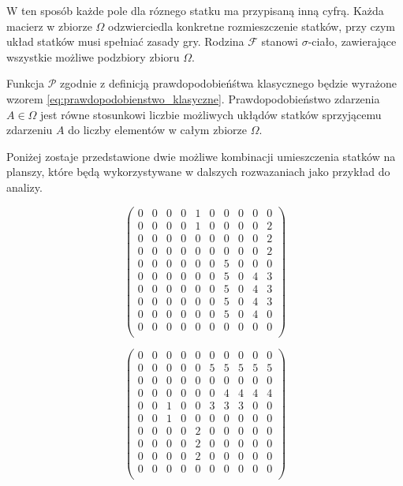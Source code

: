 \documentclass[magisterska]{pracadypl}
\begin{document}
W ten sposób każde pole dla róznego statku ma przypisaną inną cyfrą. Każda macierz w zbiorze \(\Omega\) odzwierciedla konkretne rozmieszczenie statków, przy czym układ statków musi spełniać zasady gry. Rodzina \(\mathcal{F}\) stanowi \(\sigma\)-ciało, zawierające wszystkie możliwe podzbiory zbioru \(\Omega\).

Funkcja  \(\mathcal{P}\) zgodnie z definicją prawdopodobieńśtwa klasycznego będzie wyrażone wzorem \eqref{eq:prawdopodobienstwo_klasyczne}. Prawdopodobieństwo zdarzenia $A \in \Omega$ jest równe stosunkowi liczbie możliwych ukłądów statków sprzyjącemu zdarzeniu \(A\) do liczby elementów w całym zbiorze \(\Omega\).


Poniżej zostaje przedstawione dwie możliwe kombinacji umieszczenia statków na planszy, które będą wykorzystywane w dalszych rozwazaniach jako przykład do analizy.


\begin{equation}
\begin{pmatrix}
0 & 0 & 0 & 0 & 1 & 0 & 0 & 0 & 0 & 0 \\
0 & 0 & 0 & 0 & 1 & 0 & 0 & 0 & 0 & 2 \\
0 & 0 & 0 & 0 & 0 & 0 & 0 & 0 & 0 & 2 \\
0 & 0 & 0 & 0 & 0 & 0 & 0 & 0 & 0 & 2 \\
0 & 0 & 0 & 0 & 0 & 0 & 5 & 0 & 0 & 0 \\
0 & 0 & 0 & 0 & 0 & 0 & 5 & 0 & 4 & 3 \\
0 & 0 & 0 & 0 & 0 & 0 & 5 & 0 & 4 & 3 \\
0 & 0 & 0 & 0 & 0 & 0 & 5 & 0 & 4 & 3 \\
0 & 0 & 0 & 0 & 0 & 0 & 5 & 0 & 4 & 0 \\
0 & 0 & 0 & 0 & 0 & 0 & 0 & 0 & 0 & 0 \\
\end{pmatrix}
\label{eq:example_board}
\end{equation}

\begin{equation}
\begin{pmatrix}
0 & 0 & 0 & 0 & 0 & 0 & 0 & 0 & 0 & 0 \\
0 & 0 & 0 & 0 & 0 & 5 & 5 & 5 & 5 & 5 \\
0 & 0 & 0 & 0 & 0 & 0 & 0 & 0 & 0 & 0 \\
0 & 0 & 0 & 0 & 0 & 0 & 4 & 4 & 4 & 4 \\
0 & 0 & 1 & 0 & 0 & 3 & 3 & 3 & 0 & 0 \\
0 & 0 & 1 & 0 & 0 & 0 & 0 & 0 & 0 & 0 \\
0 & 0 & 0 & 0 & 2 & 0 & 0 & 0 & 0 & 0 \\
0 & 0 & 0 & 0 & 2 & 0 & 0 & 0 & 0 & 0 \\
0 & 0 & 0 & 0 & 2 & 0 & 0 & 0 & 0 & 0 \\
0 & 0 & 0 & 0 & 0 & 0 & 0 & 0 & 0 & 0 \\
\end{pmatrix}
\label{eq:example_board_2}
\end{equation}
\end{document}
